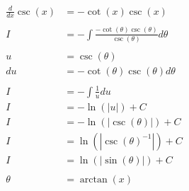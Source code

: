 \documentclass[12pt]{article}
\begin{document}
\begin{align}
    \nonumber                                                                                                                  \\
    \frac{d}{dx}\csc(x)             & = -\cot(x)\csc(x)                                                                        \\
    \nonumber                                                                                                                  \\
    I                               & = -\int \frac{-\cot(\theta)\csc(\theta)}{\csc(\theta)} d\theta                           \\
    \nonumber                                                                                                                  \\
    u                               & = \csc(\theta)                                                                           \\
    du                              & = -\cot(\theta)\csc(\theta) d\theta                                                      \\
    \nonumber                                                                                                                  \\
    I                               & = -\int \frac{1}{u} du                                                                   \\
    I                               & = -\ln(|u|) + C                                                                          \\
    I                               & = -\ln(|\csc(\theta)|) + C                                                               \\
    I                               & = \ln(|\csc(\theta)^{-1}|) + C                                                           \\
    I                               & = \ln(|\sin(\theta)|) + C                                                                \\
    \nonumber                                                                                                                  \\
    \theta                          & = \arctan(x)                                                                             \\
    \nonumber                                                                                                                  \\

\end{align}
\end{document}
